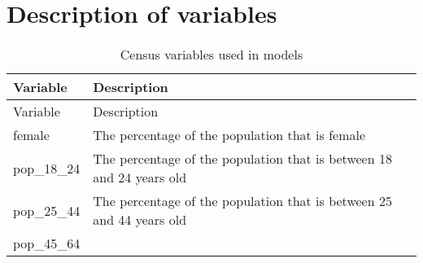 \documentclass[12pt,twoside]{reedthesis}
\begin{document}
\appendix

\hypertarget{appendix}{%
\chapter{Description of variables}\label{appendix}}
\begin{longtable}[]{@{}ll@{}}
\caption{\label{tab:var-list} Census variables used in models}\tabularnewline
\toprule
\begin{minipage}[b]{0.44\columnwidth}\raggedright
Variable\strut
\end{minipage} & \begin{minipage}[b]{0.50\columnwidth}\raggedright
Description\strut
\end{minipage}\tabularnewline
\midrule
\endfirsthead
\toprule
\begin{minipage}[b]{0.44\columnwidth}\raggedright
Variable\strut
\end{minipage} & \begin{minipage}[b]{0.50\columnwidth}\raggedright
Description\strut
\end{minipage}\tabularnewline
\midrule
\endhead
\begin{minipage}[t]{0.44\columnwidth}\raggedright
female\strut
\end{minipage} & \begin{minipage}[t]{0.50\columnwidth}\raggedright
The percentage of the population that is female\strut
\end{minipage}\tabularnewline
\begin{minipage}[t]{0.44\columnwidth}\raggedright
pop\_18\_24\strut
\end{minipage} & \begin{minipage}[t]{0.50\columnwidth}\raggedright
The percentage of the population that is between 18 and 24 years old\strut
\end{minipage}\tabularnewline
\begin{minipage}[t]{0.44\columnwidth}\raggedright
pop\_25\_44\strut
\end{minipage} & \begin{minipage}[t]{0.50\columnwidth}\raggedright
The percentage of the population that is between 25 and 44 years old\strut
\end{minipage}\tabularnewline
\begin{minipage}[t]{0.44\columnwidth}\raggedright
pop\_45\_64\strut
\end{minipage} & \begin{minipage}[t]{0.50\columnwidth}\raggedright

\end{minipage}
\end{longtable}
\end{document}
